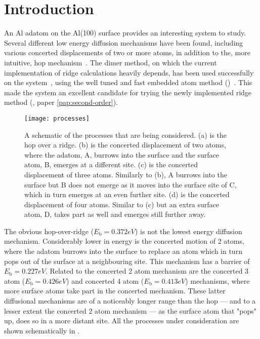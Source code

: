\section{Introduction}
\label{sec:al-introduction}
An Al adatom on the Al(100) surface provides an interesting system to study.
Several different low energy diffusion mechanisms have been found, including various concerted displacements of two or more atoms, in addition to the, more intuitive, hop mechanism~\cite{concerted-motion-1990, dimer-original-1999, ts-opt-2001}.
The dimer method, on which the current implementation of ridge calculations heavily depends, has been used successfully on the system~\cite{dimer-original-1999}, using the well tuned and fast embedded atom method ()~\cite{eam-1983, eam-1986}.
This made the system an excellent candidate for trying the newly implemented ridge method (, paper \ref{pap:second-order}).

\begin{SCfigure}[5.0][h]
\centering
\texttt{[image: processes]}
\caption{A schematic of the processes that are being considered.
(a) is the hop over a ridge.
(b) is the concerted displacement of two atoms, where the adatom, A, burrows into the surface and the surface atom, B, emerges at a different site.
(c) is the concerted displacement of three atoms.
Similarly to (b), A burrows into the surface but B does not emerge as it moves into the surface site of C, which in turn emerges at an even further site.
(d) is the concerted displacement of four atoms.
Similar to (c) but an extra surface atom, D, takes part as well and emerges still further away.
}
\label{fig:processes}
\end{SCfigure}

The obvious hop-over-ridge ($E_\text{b} = 0.372\unit{eV}$) is not the lowest energy diffusion mechanism.
Considerably lower in energy is the concerted motion of 2 atoms, where the adatom burrows into the surface to replace an atom which in turn pops out of the surface at a neighbouring site.
This mechanism has a barrier of $E_\text{b} = 0.227\unit{eV}$.
Related to the concerted 2 atom mechanism are the concerted 3 atom ($E_\text{b} = 0.426\unit{eV}$) and concerted 4 atom ($E_\text{b} = 0.413\unit{eV}$) mechanisms, where more surface atoms take part in the concerted mechanism.
These latter diffusional mechanisms are of a noticeably longer range than the hop --- and to a lesser extent the concerted 2 atom mechanism --- as the surface atom that "pops" up, does so in a more distant site.
All the processes under consideration are shown schematically in .

